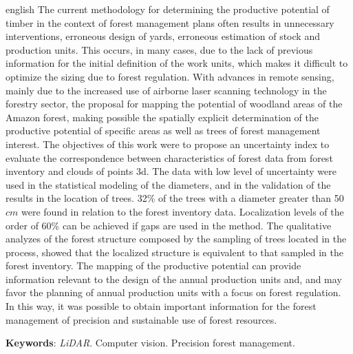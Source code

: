 \documentclass[
	12pt,				%
	openright,			%
	twoside,			%
	a4paper,			%
	chapter=TITLE,		%
	sumario=abnt-6027-2012,
	english,			%
	brazil				%
	]{UFVJM-abntex2}
\begin{document}
\begin{resumo}[ABSTRACT]
 \begin{otherlanguage*}{english}
   \noindent The current methodology for determining the productive potential of timber in the context of forest management plans often results in unnecessary interventions, erroneous design of yards, erroneous estimation of stock and production units. This occurs, in many cases, due to the lack of previous information for the initial definition of the work units, which makes it difficult to optimize the sizing due to forest regulation.
With advances in remote sensing, mainly due to the increased use of airborne laser scanning technology in the forestry sector, the proposal for mapping the potential of woodland areas of the Amazon forest, making possible the spatially explicit determination of the productive potential of specific areas as well as trees of forest management interest.
The objectives of this work were to propose an uncertainty index to evaluate the correspondence between characteristics of forest data from forest inventory and clouds of points 3d.
The data with low level of uncertainty were used in the statistical modeling of the diameters, and in the validation of the results in the location of trees.
32\% of the trees with a diameter greater than 50 $cm$ were found in relation to the forest inventory data. Localization levels of the order of 60\% can be achieved if gaps are used in the method.
The qualitative analyzes of the forest structure composed by the sampling of trees located in the process, showed that the localized structure is equivalent to that sampled in the forest inventory. 
The mapping of the productive potential can provide information relevant to the design of the annual production units and, and may favor the planning of annual production units with a focus on forest regulation. In this way, it was possible to obtain important information for the forest management of precision and sustainable use of forest resources.

   \vspace{\onelineskip}
 
   \noindent 
   \textbf{Keywords}: \textit{LiDAR}. Computer vision. Precision forest management.
 \end{otherlanguage*}
\end{resumo}
\vfill
\end{document}
